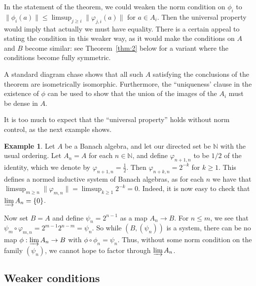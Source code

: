 \documentclass[a4paper,11pt]{article}
\newcommand{\indlim}{\varinjlim}
\theoremstyle{definition}
\newtheorem{example}[lemma]{Example}
\begin{document}
In the statement of the theorem, we could weaken the norm condition on $\phi_i$ to
$\|\phi_i(a)\| \leq \limsup_{j\geq i} \|\varphi_{j,i}(a)\|$ for $a\in A_i$.  Then the universal
property would imply that actually we must have equality.  There is a certain appeal to stating the
condition in this weaker way, as it would make the conditions on $A$ and $B$ become similar: see
Theorem~\ref{thm:2} below for a variant where the conditions become fully symmetric.

A standard diagram chase shows that all such $A$ satisfying the conclusions of the theorem are
isometrically isomorphic.  Furthermore, the ``uniqueness' clause in the existence of $\phi$ can be
used to show that the union of the images of the $A_i$ must be dense in $A$.

It is too much to expect that the ``universal property'' holds without norm control, as the next
example shows.

\begin{example}\label{ex:one}
Let $A$ be a Banach algebra, and let our directed set be $\mathbb N$ with the usual ordering.
Let $A_n = A$ for each $n\in\mathbb N$, and define $\varphi_{n+1,n}$ to be $1/2$ of the identity,
which we denote by $\varphi_{n+1,n} = \frac12$.  Then $\varphi_{n+k,n} = 2^{-k}$ for $k\geq 1$.
This defines a normed inductive system of Banach algebras, as for each $n$ we have that
$\limsup_{m\geq n} \|\varphi_{m,n}\| = \limsup_{k\geq 1} 2^{-k} = 0$.  Indeed, it is now easy to
check that $\indlim A_n = \{0\}$.

Now set $B=A$ and define $\psi_n = 2^{n-1}$ as a map $A_n\rightarrow B$.  For $n\leq m$, we see that
$\psi_m \circ \varphi_{m,n} = 2^{m-1} 2^{n-m} = \psi_n$.  So while $(B, (\psi_n))$ is a system,
there can be no map $\phi:\indlim A_n\rightarrow B$ with $\phi\circ\phi_n = \psi_n$.  Thus, without
some norm condition on the family $(\psi_n)$, we cannot hope to factor through $\indlim A_n$.
\end{example}



\subsection{Weaker conditions}
\end{document}
